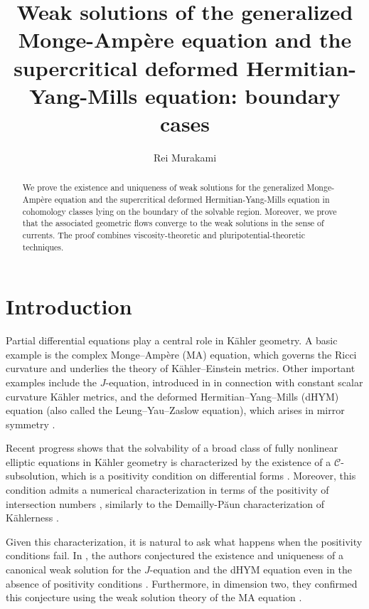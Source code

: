 \documentclass{amsart}
\author[R.\ Murakami]{Rei Murakami}
\numberwithin{equation}{section}
\theoremstyle{plain}
\theoremstyle{definition}
\theoremstyle{remark}
\begin{document}
\title[Weak solutions of the gMA/dHYM equations: boundary cases]{Weak solutions of the generalized Monge-Ampère equation and the supercritical deformed Hermitian-Yang-Mills equation: boundary cases}

\begin{abstract}
    We prove the existence and uniqueness of weak solutions for the generalized Monge-Ampère equation and the supercritical deformed Hermitian-Yang-Mills equation in cohomology classes lying on the boundary of the solvable region. Moreover, we prove that the associated geometric flows converge to the weak solutions in the sense of currents. The proof combines viscosity-theoretic and pluripotential-theoretic techniques.
\end{abstract}

\maketitle


\section{Introduction}\label{sec:intro}
Partial differential equations play a central role in Kähler geometry. 
A basic example is the complex Monge–Ampère (MA) equation, which governs the Ricci curvature and underlies the theory of Kähler–Einstein metrics. Other important examples include the $J$-equation, introduced in \cite{Don,XChen} in connection with constant scalar curvature Kähler metrics, and the deformed Hermitian–Yang–Mills (dHYM) equation (also called the Leung–Yau–Zaslow equation), which arises in mirror symmetry \cite{LYZ}.

Recent progress shows that the solvability of a broad class of fully nonlinear elliptic equations in Kähler geometry is characterized by the existence of a $\mathcal{C}$-subsolution, which is a positivity condition on differential forms \cite{SW,FLM,DK,Sun,Sze,GS,CJY,Pin,Lina,Linb,FYZ2}. 
Moreover, this condition admits a numerical characterization in terms of the positivity of intersection numbers \cite{GChen,Song,Datar-Pingali,CLT,FM}, similarly to the Demailly-Păun characterization of Kählerness \cite{DP}. 

Given this characterization, it is natural to ask what happens when the positivity conditions fail. In \cite{DMS}, the authors conjectured the existence and uniqueness of a canonical weak solution for the $J$-equation and the dHYM equation even in the absence of positivity conditions \cite[Conjectures 1.5 and 1.12]{DMS}. Furthermore, in dimension two, they confirmed this conjecture using the weak solution theory of the MA equation \cite{BEGZ}.
\end{document}
